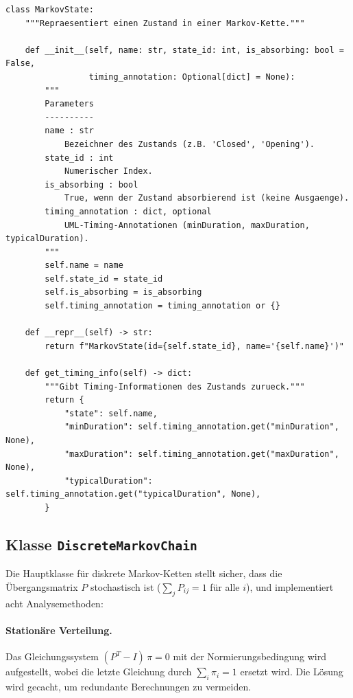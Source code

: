 ﻿\documentclass[a4paper,12pt]{report}
\theoremstyle{definition}
\begin{document}
\begin{lstlisting}[style=python, caption={MarkovState: Zustand mit MARTE-konformen Timing-Annotationen}, label=lst:markovstate]
class MarkovState:
    """Repraesentiert einen Zustand in einer Markov-Kette."""

    def __init__(self, name: str, state_id: int, is_absorbing: bool = False,
                 timing_annotation: Optional[dict] = None):
        """
        Parameters
        ----------
        name : str
            Bezeichner des Zustands (z.B. 'Closed', 'Opening').
        state_id : int
            Numerischer Index.
        is_absorbing : bool
            True, wenn der Zustand absorbierend ist (keine Ausgaenge).
        timing_annotation : dict, optional
            UML-Timing-Annotationen (minDuration, maxDuration, typicalDuration).
        """
        self.name = name
        self.state_id = state_id
        self.is_absorbing = is_absorbing
        self.timing_annotation = timing_annotation or {}

    def __repr__(self) -> str:
        return f"MarkovState(id={self.state_id}, name='{self.name}')"

    def get_timing_info(self) -> dict:
        """Gibt Timing-Informationen des Zustands zurueck."""
        return {
            "state": self.name,
            "minDuration": self.timing_annotation.get("minDuration", None),
            "maxDuration": self.timing_annotation.get("maxDuration", None),
            "typicalDuration": self.timing_annotation.get("typicalDuration", None),
        }
\end{lstlisting}

\subsection{Klasse \texttt{DiscreteMarkovChain}}

Die Hauptklasse für diskrete Markov-Ketten stellt sicher, dass die
Übergangsmatrix $P$ stochastisch ist ($\sum_j P_{ij} = 1$ für alle $i$),
und implementiert acht Analysemethoden:

\paragraph{Stationäre Verteilung.}
Das Gleichungssystem $(P^T - I)\,\pi = 0$ mit der Normierungsbedingung
wird aufgestellt, wobei die letzte Gleichung durch $\sum_i \pi_i = 1$
ersetzt wird. Die Lösung wird gecacht, um redundante Berechnungen zu vermeiden.
\end{document}

